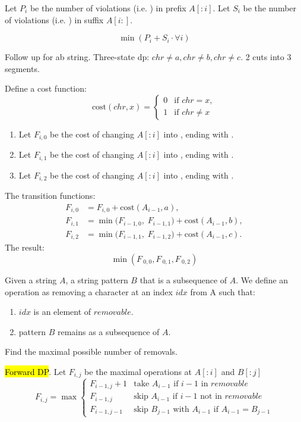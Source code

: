 Let $P_i$ be the number of violations (i.e. ) in prefix $A[:i]$. Let $S_i$ be the number of violations (i.e. ) in suffix $A[i:]$. 

$$
\min(P_i + S_i \cdot \forall i)
$$

 Follow up for ab string. Three-state dp: $chr \neq a, chr \neq b, chr \neq c$. 2 cuts into 3 segments.

Define a cost function:
\[
\text{cost}(chr, x) =
	\begin{cases}
	0 & \text{if } chr = x, \\
	1 & \text{if } chr \neq x
	\end{cases}
\]
\begin{enumerate}
\item Let $F_{i, 0}$ be the cost of changing $A[:i]$ into , ending with . 
\item Let $F_{i, 1}$ be the cost of changing $A[:i]$ into , ending with . 
\item Let $F_{i, 2}$ be the cost of changing $A[:i]$ into , ending with . 
\end{enumerate}
The transition functions:
\[
\begin{aligned}
F_{i, 0} &= F_{i, 0} + \text{cost}(A_{i-1}, a), \\
F_{i, 1} &= \min\big(F_{i-1, 0}, \; F_{i-1, 1}\big) + \text{cost}(A_{i-1}, b), \\
F_{i, 2} &= \min\big(F_{i-1, 1}, \; F_{i-1, 2}\big) + \text{cost}(A_{i-1}, c).
\end{aligned}
\]
The result:
$$
\min(F_{~0, 0}, F_{~0, 1}, F_{~0, 2})
$$

 Given a string $A$, a string pattern $B$ that is a subsequence of $A$.
We define an operation as removing a character at an index $idx$ from A such that:
\begin{enumerate}
\item $idx$ is an element of $removable$.
\item pattern $B$ remains as a subsequence of $A$. 
\end{enumerate}
Find the maximal possible number of removals.

\hl{Forward DP}. Let $F_{i,j}$ be the maximal operations at $A[:i]$ and $B[:j]$
\[
F_{i,j} = \max
\begin{cases}
F_{i-1,j} + 1 &\text{take $A_{i-1}$ if $i-1$ in $removable$}\\
F_{i-1,j} &\text{skip $A_{i-1}$ if $i-1$ not in $removable$} \\
F_{i-1,j-1}&\text{skip $B_{j-1}$ with $A_{i-1}$ if $A_{i-1} = B_{j-1}$}
\end{cases}
\]

